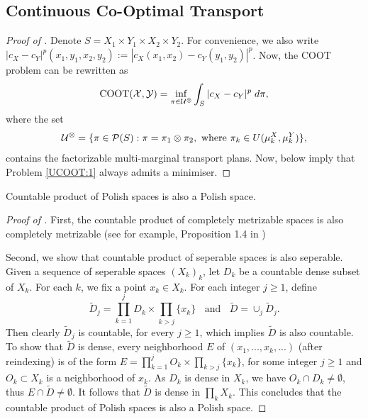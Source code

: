 \subsection{Continuous Co-Optimal Transport} \label{annex:cont_coot}

\begin{proof}[Proof of ]
  Denote $S = X_1 \times Y_1 \times X_2 \times Y_2$.
  For convenience, we also write
  $|c_X - c_Y|^p(x_1, y_1, x_2, y_2) := |c_X(x_1, x_2) - c_Y(y_1, y_2) |^p$.
  Now, the COOT problem can be rewritten as
  \begin{equation} \label{UCOOT:1}
    \text{COOT}(\mathcal X, \mathcal Y) = \inf_{\pi \in \mathcal U^{\otimes}} \int_{S} \vert c_X - c_Y \vert^p \; d\pi,
  \end{equation}
  where the set
  \begin{equation}
    \mathcal U^{\otimes} = \{ \pi \in \mathcal P(S): \pi = \pi_1 \otimes \pi_2,
    \text{ where } \pi_k \in U(\mu_k^X, \mu_k^Y) \},
  \end{equation}
  contains the factorizable multi-marginal transport plans.
  Now, 
  below imply that Problem \eqref{UCOOT:1} always admits a minimiser.
\end{proof}
\begin{lemma} \label{lemma:product_polish}
  Countable product of Polish spaces is also a Polish space.
\end{lemma}
\begin{proof}[Proof of ]
  First, the countable product of completely metrizable spaces is also completely metrizable
  (see for example, Proposition 1.4 in \citep{Dominique20})

  Second, we show that countable product of seperable spaces is also seperable.
  Given a sequence of seperable spaces $(X_k)_k$,
  let $D_k$ be a countable dense subset of $X_k$. For each $k$,
  we fix a point $x_k \in X_k$. For each integer $j \geq 1$, define
  \begin{equation}
    \widetilde{D}_j = \prod_{k=1}^j D_k \times \prod_{k > j} \{ x_k \}
    \;\; \text{ and } \;\;
    \widetilde{D} = \cup_{j} \widetilde{D}_j.
  \end{equation}
  Then clearly $\widetilde{D}_j$ is countable, for every $j \geq 1$,
  which implies $\widetilde{D}$ is also countable.
  To show that $\widetilde{D}$ is dense, every neighborhood $E$ of
  $(x_1, ..., x_k, ...)$ (after reindexing) is of the form
  $E = \prod_{k=1}^j O_k \times \prod_{k > j} \{ x_k \}$,
  for some integer $j \geq 1$ and $O_k \subset X_k$ is a neighborhood of $x_k$.
  As $D_k$ is dense in $X_k$, we have $O_k \cap D_k \neq \emptyset$,
  thus $E \cap \widetilde{D} \neq \emptyset$.
  It follows that $\widetilde{D}$ is dense in $\prod_k X_k$.
  This concludes that the countable product of Polish spaces is also a Polish space.
\end{proof}
